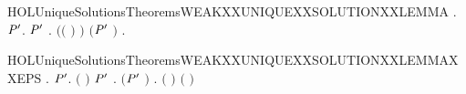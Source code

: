\begin{SaveVerbatim}{HOLUniqueSolutionsTheoremsWEAKXXUNIQUEXXSOLUTIONXXLEMMA}
\HOLTokenTurnstile{} \HOLSymConst{\HOLTokenForall{}}.
         \HOLSymConst{\HOLTokenConj{}}   \HOLSymConst{\HOLTokenImp{}}
       \HOLSymConst{\HOLTokenForall{}}  \ensuremath{\HOLBoundVar{P}\sp{\prime}}.
             \HOLTokenTransBegin{}\HOLTokenTransEnd \ensuremath{\HOLBoundVar{P}\sp{\prime}} \HOLSymConst{\HOLTokenImp{}}
           \HOLSymConst{\HOLTokenExists{}}.
                 \HOLSymConst{\HOLTokenConj{}} \ensuremath{(}\ensuremath{(} \HOLSymConst{\ensuremath{=}} \HOLConst{\ensuremath{\tau}}\ensuremath{)} \HOLSymConst{\HOLTokenImp{}}  \ensuremath{)} \HOLSymConst{\HOLTokenConj{}} \ensuremath{(}\ensuremath{\HOLBoundVar{P}\sp{\prime}} \HOLSymConst{\ensuremath{=}}  \ensuremath{)} \HOLSymConst{\HOLTokenConj{}}
               \HOLSymConst{\HOLTokenForall{}}.   \HOLTokenTransBegin{}\HOLTokenTransEnd {} 
\end{SaveVerbatim}
\newcommand{\HOLUniqueSolutionsTheoremsWEAKXXUNIQUEXXSOLUTIONXXLEMMA}{\UseVerbatim{HOLUniqueSolutionsTheoremsWEAKXXUNIQUEXXSOLUTIONXXLEMMA}}
\begin{SaveVerbatim}{HOLUniqueSolutionsTheoremsWEAKXXUNIQUEXXSOLUTIONXXLEMMAXXEPS}
\HOLTokenTurnstile{} \HOLSymConst{\HOLTokenForall{}}.
         \HOLSymConst{\HOLTokenConj{}}   \HOLSymConst{\HOLTokenImp{}}
       \HOLSymConst{\HOLTokenForall{}} \ensuremath{\HOLBoundVar{P}\sp{\prime}}.
            \ensuremath{(} \ensuremath{)} \ensuremath{\HOLBoundVar{P}\sp{\prime}} \HOLSymConst{\HOLTokenImp{}}
           \HOLSymConst{\HOLTokenExists{}}.   \HOLSymConst{\HOLTokenConj{}}   \HOLSymConst{\HOLTokenConj{}} \ensuremath{(}\ensuremath{\HOLBoundVar{P}\sp{\prime}} \HOLSymConst{\ensuremath{=}}  \ensuremath{)} \HOLSymConst{\HOLTokenConj{}} \HOLSymConst{\HOLTokenForall{}}.  \ensuremath{(} \ensuremath{)} \ensuremath{(} \ensuremath{)}
\end{SaveVerbatim}
